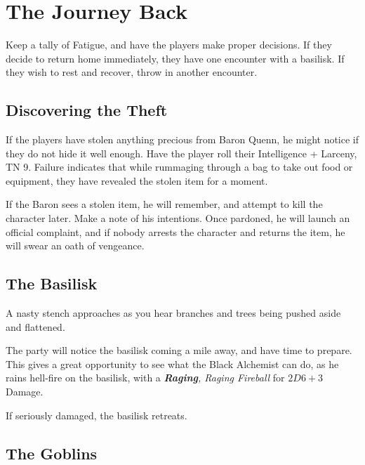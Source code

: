 \section{The Journey Back}
\label{siege}

\begin{multicols}{2}

\noindent
Keep a tally of Fatigue, and have the players make proper decisions.
If they decide to return home immediately, they have one encounter with a basilisk.
If they wish to rest and recover, throw in another encounter.

\subsection{Discovering the Theft}

If the players have stolen anything precious from Baron Quenn, he might notice if they do not hide it well enough.
Have the player roll their Intelligence + Larceny, TN 9.
Failure indicates that while rummaging through a bag to take out food or equipment, they have revealed the stolen item for a moment.

If the Baron sees a stolen item, he will remember, and attempt to kill the character later.
Make a note of his intentions.
Once pardoned, he will launch an official complaint, and if nobody arrests the character and returns the item, he will swear an oath of vengeance.

\subsection{The Basilisk}

\begin{boxtext}

  A nasty stench approaches as you hear branches and trees being pushed aside and flattened.

\end{boxtext}

The party will notice the basilisk coming a mile away, and have time to prepare.
This gives a great opportunity to see what the Black Alchemist can do, as he rains hell-fire on the basilisk, with a \textit{\textbf{Raging}, Raging Fireball} for $2D6+3$ Damage.

\basilisk

If seriously damaged, the basilisk retreats.

\subsection{The Goblins}


\end{multicols}
